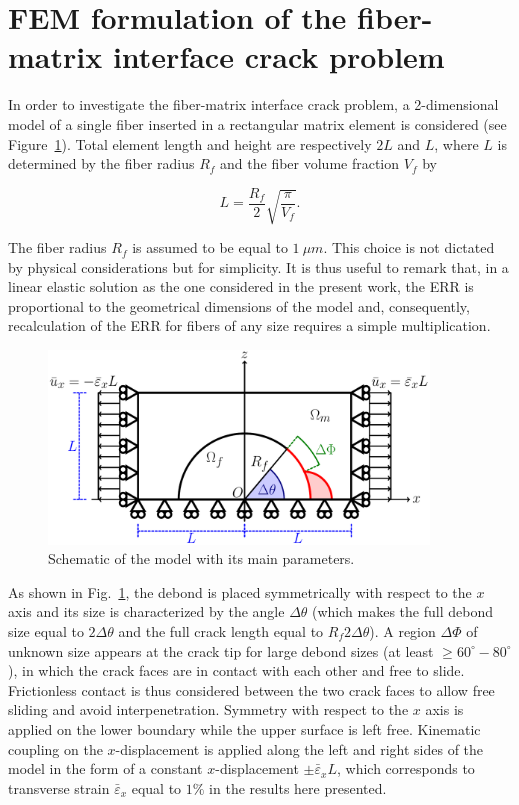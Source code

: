 \section{FEM formulation of the fiber-matrix interface crack problem}\label{paperA:sec:femmodel}

In order to investigate the fiber-matrix interface crack problem, a 2-dimensional model of a single fiber inserted in a rectangular matrix element is considered (see Figure~\ref{paperA:fig:modelschem}). Total element length and height are respectively $2L$ and $L$, where $L$ is determined by the fiber radius $R_{f}$ and the fiber volume fraction $V_{f}$ by

\begin{equation}\label{paperA:eq:LVf}
L=\frac{R_{f}}{2}\sqrt{\frac{\pi}{V_{f}}}.
\end{equation}

The fiber radius $R_{f}$ is assumed to be equal to $1\ \mu m$. This choice is not dictated by physical considerations but for simplicity. It is thus useful to remark that, in a linear elastic solution as the one considered in the present work, the ERR is proportional to the geometrical dimensions of the model and, consequently, recalculation of the ERR for fibers of any size requires a simple multiplication.

\begin{figure}[!h]
\centering
\includegraphics[width=0.9\textwidth]{paperA/RUC.pdf}
\caption{Schematic of the model with its main parameters.}\label{paperA:fig:modelschem}
\end{figure}

As shown in Fig.~\ref{paperA:fig:modelschem}, the debond is placed symmetrically with respect to the $x$ axis and its size is characterized by the angle $\Delta\theta$ (which makes the full debond size equal to $2\Delta\theta$ and the full crack length equal to $R_{f}2{\Delta\theta}$). A region $\Delta\Phi$ of unknown size appears at the crack tip for large debond sizes (at least $\geq 60^{\circ}-80^{\circ}$), in which the crack faces are in contact with each other and free to slide. Frictionless contact is thus considered between the two crack faces to allow free sliding and avoid interpenetration. Symmetry with respect to the $x$ axis is applied on the lower boundary while the upper surface is left free. Kinematic coupling on the $x$-displacement is applied along the left and right sides of the model in the form of a constant $x$-displacement $\pm\bar{\varepsilon}_{x} L$, which corresponds to transverse strain $\bar{\varepsilon}_{x}$ equal to $1\%$ in the results here presented.

